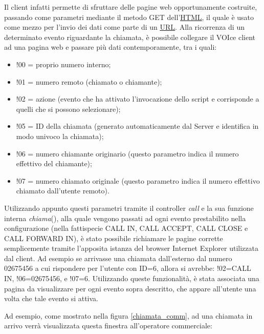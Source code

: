 \noindent
Il client infatti permette di sfruttare delle pagine web opportunamente costruite, passando come parametri mediante il metodo GET dell'\hyperlink{html}{\underline{HTML}}, il quale \`e usato come mezzo per l'invio dei dati come parte di un \hyperlink{url}{\underline{URL}}. Alla ricorrenza di un determinato evento riguardante la chiamata, \`e possibile collegare il VOIce client ad una pagina web e passare pi\`u dati contemporamente, tra i quali: 
\begin{itemize}
 \item !00 = proprio numero interno;
 \item !01 = numero remoto (chiamato o chiamante);
 \item !02 = azione (evento che ha attivato l'invocazione dello script e corrisponde a quelli che si possono selezionare);
 \item !05 = ID della chiamata (generato automaticamente dal Server e identifica in modo univoco la chiamata);
 \item !06 = numero chiamante originario (questo parametro indica il numero effettivo del chiamante);
 \item !07 = numero chiamato originale (questo parametro indica il numero effettivo chiamato dall'utente remoto).
\end{itemize}
Utilizzando appunto questi parametri tramite il controller \textit{call} e la sua funzione interna \textit{chiama}(), alla quale vengono passati ad ogni evento prestabilito nella configurazione (nella fattispecie CALL IN, CALL ACCEPT, CALL CLOSE e CALL FORWARD IN), \`e stato possibile richiamare le pagine corrette semplicemente tramite l'apposita istanza del browser Internet Explorer utilizzata dal client. Ad esempio se arrivasse una chiamata dall'esterno dal numero 02675456 a cui rispondere per l'utente con ID=6, allora si avrebbe: !02=CALL IN, !06=02675456, e !07=6. Utilizzando queste funzionalit\`a, \`e stata associata una pagina da visualizzare per ogni evento sopra descritto, che appare all'utente una volta che tale evento si attiva. 

\newpage
Ad esempio, come mostrato nella figura \ref{chiamata_comm}, ad una chiamata in arrivo verr\`a visualizzata questa finestra all'operatore commerciale:

